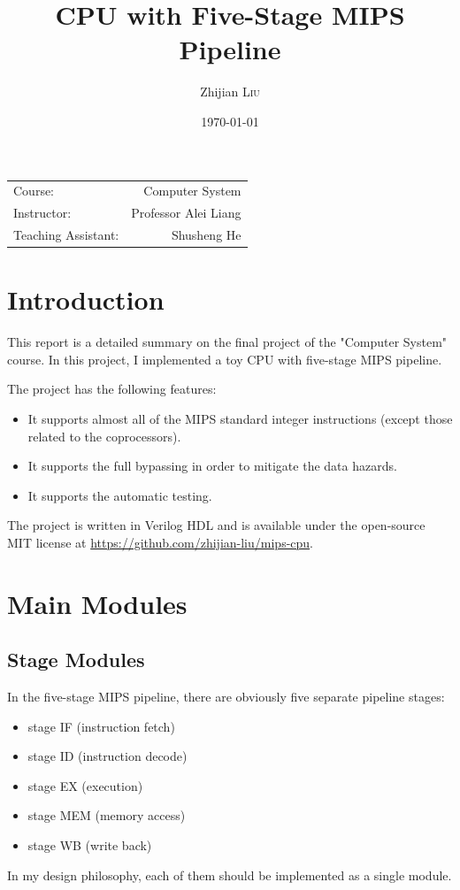 \documentclass{article}
\title{CPU with Five-Stage MIPS Pipeline}
\author{Zhijian \textsc{Liu}}
\date{\today}
\begin{document}
\maketitle

\begin{center}
\begin{tabular}{l r}
Course: & Computer System\\
Instructor: & Professor Alei Liang\\
Teaching Assistant: & Shusheng He
\end{tabular}
\end{center}

\tableofcontents
\newpage

\section{Introduction}
This report is a detailed summary on the final project of the "Computer System" course. In this project, I implemented a toy CPU with five-stage MIPS pipeline.

The project has the following features:
\begin{itemize}
\item
It supports almost all of the MIPS standard integer instructions (except those related to the coprocessors).
\item
It supports the full bypassing in order to mitigate the data hazards.
\item
It supports the automatic testing.
\end{itemize}
The project is written in Verilog HDL and is available under the open-source MIT license at \url{https://github.com/zhijian-liu/mips-cpu}.

\section{Main Modules}

\subsection{Stage Modules}
In the five-stage MIPS pipeline, there are obviously five separate pipeline stages:
\begin{itemize}
\item
stage IF (instruction fetch)
\item
stage ID (instruction decode)
\item
stage EX (execution)
\item
stage MEM (memory access)
\item
stage WB (write back)
\end{itemize}
In my design philosophy, each of them should be implemented as a single module.
\end{document}

